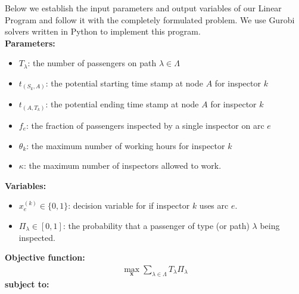 \documentclass[11pt]{article}
\begin{document}
\par Below we establish the input parameters and output variables of our Linear Program and follow it with the completely formulated problem. We use Gurobi solvers written in Python to implement this program.\\
\textbf{Parameters:}
\begin{itemize}\itemsep -2pt
    \item $T_\lambda$: the number of passengers on path $\lambda\in\Lambda$
    \item $t_{(S_k,A)}$: the potential starting time stamp at node $A$ for inspector $k$
    \item $t_{(A,T_k)}$: the potential ending time stamp at node $A$ for inspector $k$
    \item $f_e$: the fraction of passengers inspected by a single inspector on arc $e$
    \item $\theta_k$: the maximum number of working hours for inspector $k$
    \item $\kappa$: the maximum number of inspectors allowed to work.
\end{itemize}
\textbf{Variables:}
\begin{itemize}\itemsep -2pt
    \item $x_e^{(k)}\in\{0,1\}$: decision variable for if inspector $k$ uses arc $e$.
    \item $\Pi_\lambda\in [0,1]$: the probability that a passenger of type (or path) $\lambda$ being inspected.
\end{itemize}
\textbf{Objective function:}
\begin{align}
    \max_{\textbf{x}} \sum_{\lambda\in\Lambda}T_\lambda\Pi_\lambda
\end{align}
\textbf{subject to:}
\end{document}
